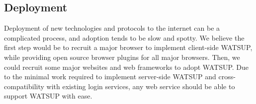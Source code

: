 \subsection{Deployment}

Deployment of new technologies and protocols to the internet can be a complicated process, and adoption tends to be slow and spotty. We believe the first step would be to recruit a major browser to implement client-side WATSUP, while providing open source browser plugins for all major browsers. Then, we could recruit some major websites and web frameworks to adopt WATSUP. Due to the minimal work required to implement server-side WATSUP and cross-compatibility with existing login services, any web service should be able to support WATSUP with ease.

